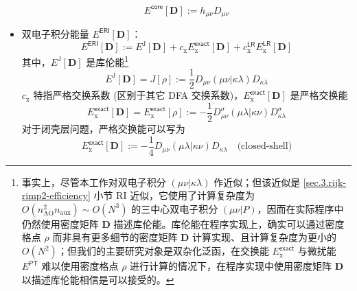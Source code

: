 \begin{itemize}[nosep]
        \begin{equation}
          E^\textsf{core} [\mathbf{D}] := h_{\mu \nu} D_{\mu \nu}
        \end{equation}
  \item 双电子积分能量 $E^\textsf{ERI} [\mathbf{D}]$：
        \begin{equation}
          \label{eq.3.def.eng-eri}
          E^\textsf{ERI} [\mathbf{D}] := E^\textsf{J} [\mathbf{D}] + c_\mathrm{x} E_\mathrm{x}^\textsf{exact} [\mathbf{D}] + c_\mathrm{x}^\textsf{LR} E_\mathrm{x}^\textsf{LR} [\mathbf{D}]
        \end{equation}
        其中，$E^\textsf{J} [\mathbf{D}]$ 是库伦能\footnote{事实上，尽管本工作对双电子积分 $(\mu \nu | \kappa \lambda)$ 作近似；但该近似是 \ref{sec.3.rijk-rimp2-efficiency} 小节 RI 近似，它使用了计算复杂度为 $O(n_\mathrm{AO}^2 n_\mathrm{aux}) \sim O(N^3)$ 的三中心双电子积分 $(\mu \nu | P)$，因而在实际程序中仍然使用密度矩阵 $\mathbf{D}$ 描述库伦能。库伦能在程序实现上，确实可以通过密度格点 $\rho$ 而非具有更多细节的密度矩阵 $\mathbf{D}$ 计算实现、且计算复杂度为更小的 $O(N^2)$\cite{Toivanen-Sundholm.PCCP.2015}；但我们的主要研究对象是双杂化泛函，在交换能 $E_\mathrm{x}^\textsf{exact}$ 与微扰能 $E^\textsf{PT}$ 难以使用密度格点 $\rho$ 进行计算的情况下，在程序实现中使用密度矩阵 $\mathbf{D}$ 以描述库伦能相信是可以接受的。}
        \begin{equation}
          \label{eq.3.def.ej}
          E^\textsf{J} [\mathbf{D}] = J[\rho] := \frac{1}{2} D_{\mu \nu} (\mu \nu | \kappa \lambda) D_{\kappa \lambda}
        \end{equation}
        $c_\mathrm{x}$ 特指严格交换系数 (区别于其它 DFA 交换系数)，$E_\mathrm{x}^\textsf{exact} [\mathbf{D}]$ 是严格交换能
        \begin{equation}
          E_\mathrm{x}^\textsf{exact} [\mathbf{D}] = E_\mathrm{x}^\textsf{exact} [\rho] := - \frac{1}{2} D_{\mu \nu}^\sigma (\mu \lambda | \kappa \nu) D_{\kappa \lambda}^\sigma
        \end{equation}
        对于闭壳层问题，严格交换能可以写为
        \begin{equation}
          E_\mathrm{x}^\textsf{exact} [\mathbf{D}] := - \frac{1}{4} D_{\mu \nu} (\mu \lambda | \kappa \nu) D_{\kappa \lambda} \quad \text{(closed-shell)}
        \end{equation}

\end{itemize}
